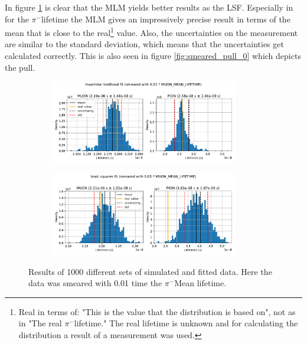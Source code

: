 \documentclass[11pt, a4paper, oneside]{book}
\newcommand\DoublePlotwidth{0.9}
\newcommand{\pion}{$\pi^{-}$}
\begin{document}
In figure \ref{fig:results_smeared_0} is clear that the MLM yields better results as the LSF. Especially in for the \pion lifetime the MLM gives an impressively precise result in terms of the mean that is close to the real\footnote{Real in terms of: "This is the value that the distribution is based on", not as in "The real \pion lifetime." The real lifetime is unknown and for calculating the distribution a result of a measurement was used.} value. Also, the uncertainties on the measurement are similar to the standard deviation, which means that the uncertainties get calculated correctly. This is also seen in figure \ref{fig:smeared_pull_0} which depicts the pull.

\begin{figure}[h]
\begin{subfigure}{\textwidth}
  \centering
  \includegraphics[width=\DoublePlotwidth\textwidth]{images/4b_hist_0_likelihood.pdf}
\end{subfigure}

\begin{subfigure}{\textwidth}
  \centering
  \includegraphics[width=\DoublePlotwidth\textwidth]{images/4b_hist_0_squares.pdf}
\end{subfigure}
\caption{Results of 1000 different sets of simulated and fitted data. Here the data was smeared with 0.01 time the \pion Mean lifetime.}
\label{fig:results_smeared_0}
\end{figure}
\end{document}
